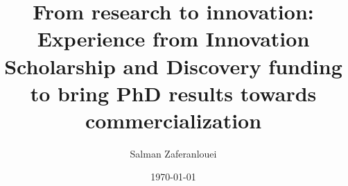 \title{From research to innovation: Experience from Innovation Scholarship and Discovery funding to bring PhD results towards commercialization }



\author{Salman Zaferanlouei}
\date{\today}
